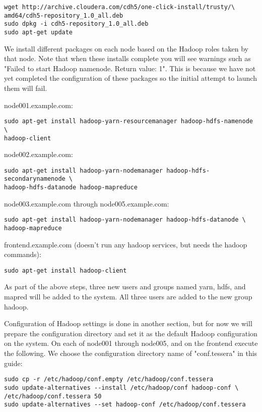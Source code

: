 \begin{verbatim}
wget http://archive.cloudera.com/cdh5/one-click-install/trusty/\
amd64/cdh5-repository_1.0_all.deb
sudo dpkg -i cdh5-repository_1.0_all.deb
sudo apt-get update
\end{verbatim}

We install different packages on each node based on the Hadoop roles
taken by that node.  Note that when these installs complete you will see
warnings such as "Failed to start Hadoop namenode. Return value: 1".
This is because we have not yet completed the configuration of these
packages so the initial attempt to launch them will fail.

node001.example.com:
\begin{verbatim}
sudo apt-get install hadoop-yarn-resourcemanager hadoop-hdfs-namenode \
hadoop-client
\end{verbatim}

node002.example.com:
\begin{verbatim}
sudo apt-get install hadoop-yarn-nodemanager hadoop-hdfs-secondarynamenode \
hadoop-hdfs-datanode hadoop-mapreduce 
\end{verbatim}

node003.example.com through node005.example.com:
\begin{verbatim}
sudo apt-get install hadoop-yarn-nodemanager hadoop-hdfs-datanode \
hadoop-mapreduce
\end{verbatim}

frontend.example.com (doesn't run any hadoop services, but needs the hadoop commands):
\begin{verbatim}
sudo apt-get install hadoop-client
\end{verbatim}

As part of the above steps, three new users and groups named yarn, hdfs,
and mapred will be added to the system.  All three users are added to
the new group hadoop.

Configuration of Hadoop settings is done in another section, but for now
we will prepare the configuration directory and set it as the default
Hadoop configuration on the system.  On each of node001 through node005,
and on the frontend execute the following.  We choose the configuration
directory name of "conf.tessera" in this guide:

\begin{verbatim}
sudo cp -r /etc/hadoop/conf.empty /etc/hadoop/conf.tessera
sudo update-alternatives --install /etc/hadoop/conf hadoop-conf \
/etc/hadoop/conf.tessera 50
sudo update-alternatives --set hadoop-conf /etc/hadoop/conf.tessera
\end{verbatim}


